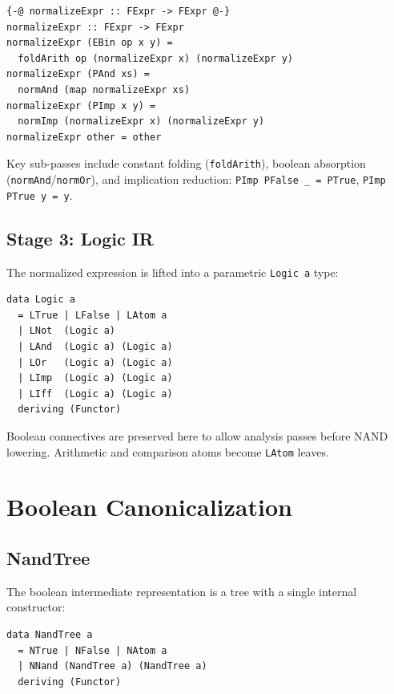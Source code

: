 \documentclass[sigconf,natbib=false]{acmart}
\begin{document}
\begin{lstlisting}[style=haskell,caption={Recursive normalization (excerpt)}]
{-@ normalizeExpr :: FExpr -> FExpr @-}
normalizeExpr :: FExpr -> FExpr
normalizeExpr (EBin op x y) =
  foldArith op (normalizeExpr x) (normalizeExpr y)
normalizeExpr (PAnd xs) =
  normAnd (map normalizeExpr xs)
normalizeExpr (PImp x y) =
  normImp (normalizeExpr x) (normalizeExpr y)
normalizeExpr other = other
\end{lstlisting}

Key sub-passes include constant folding (\texttt{foldArith}), boolean absorption
(\texttt{normAnd}/\texttt{normOr}), and implication reduction:
\texttt{PImp PFalse \_ = PTrue}, \texttt{PImp PTrue y = y}.

\subsection{Stage 3: Logic IR}

The normalized expression is lifted into a parametric \texttt{Logic a} type:

\begin{lstlisting}[style=haskell,caption={Logic IR}]
data Logic a
  = LTrue | LFalse | LAtom a
  | LNot  (Logic a)
  | LAnd  (Logic a) (Logic a)
  | LOr   (Logic a) (Logic a)
  | LImp  (Logic a) (Logic a)
  | LIff  (Logic a) (Logic a)
  deriving (Functor)
\end{lstlisting}

Boolean connectives are preserved here to allow analysis passes before NAND
lowering. Arithmetic and comparison atoms become \texttt{LAtom} leaves.


\section{Boolean Canonicalization}
\label{sec:nand}

\subsection{NandTree}

The boolean intermediate representation is a tree with a single internal constructor:

\begin{lstlisting}[style=haskell,caption={NandTree IR}]
data NandTree a
  = NTrue | NFalse | NAtom a
  | NNand (NandTree a) (NandTree a)
  deriving (Functor)
\end{lstlisting}
\end{document}
